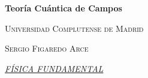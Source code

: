 \begin{titlepage}
	\centering
	\vspace*{\fill}
	{\fontsize{30pt}{36pt}\selectfont\bfseries Teoría Cuántica de Campos\par}
	\vspace{.5cm}
	{\scshape\LARGE Universidad Complutense de Madrid\par}
	\vspace{100pt}
	\par
	\vspace{100pt}
	{\scshape\LARGE Sergio Figaredo Arce\par}
	\vspace{0.5cm}
	{\Large\itshape\underline{FÍSICA FUNDAMENTAL}\par}
	\vspace*{\fill}
\end{titlepage}